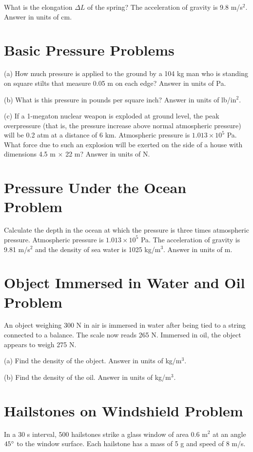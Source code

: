 \documentclass[../physics12.tex]{subfiles}
\begin{document}
What is the elongation $\Delta L$ of the spring? The acceleration of gravity is 9.8 m/s$^2$. Answer in units of cm.

\section{Basic Pressure Problems}
(a) How much pressure is applied to the ground by a 104 kg man who is standing on square stilts that measure 0.05 m on each edge? Answer in units of Pa.

(b) What is this pressure in pounds per square inch? Answer in units of lb/in$^2$.

(c) If a 1-megaton nuclear weapon is exploded at ground level, the peak overpressure (that is, the pressure increase above normal atmospheric pressure) will be 0.2 atm at a distance of 6 km. Atmospheric pressure is $1.013\times 10^5$ Pa. What force due to such an explosion will be exerted on the side of a house with dimensions 4.5 m $\times$ 22 m? Answer in units of N.

\section{Pressure Under the Ocean Problem}
Calculate the depth in the ocean at which the pressure is three times atmospheric pressure. Atmospheric pressure is $1.013\times 10^5$ Pa. The acceleration of gravity is 9.81 m/s$^2$ and the density of sea water is 1025 kg/m$^3$. Answer in units of m.

\section{Object Immersed in Water and Oil Problem}
An object weighing 300 N in air is immersed in water after being tied to a string connected to a balance. The scale now reads 265 N. Immersed in oil, the object appears to weigh 275 N.

(a) Find the density of the object. Answer in units of kg/m$^3$.

(b) Find the density of the oil. Answer in units of kg/m$^3$.

\section{Hailstones on Windshield Problem}
In a 30 s interval, 500 hailstones strike a glass window of area 0.6 m$^2$ at an angle $45\degree$ to the window surface. Each hailstone has a mass of 5 g and speed of 8 m/s.
\end{document}
